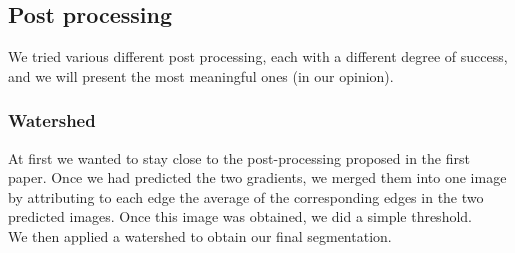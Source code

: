 \subsection{Post processing}

We tried various different post processing, each with a different degree of
success, and we will present the most meaningful ones (in our opinion).

\subsubsection{Watershed}

At first we wanted to stay close to the post-processing proposed in the first paper.
Once we had predicted the two gradients, we merged them into one image by
attributing to each edge the average of the corresponding edges in the two
predicted images. Once this image was obtained, we did a simple threshold.\\
We then applied a watershed to obtain our final segmentation.\\

